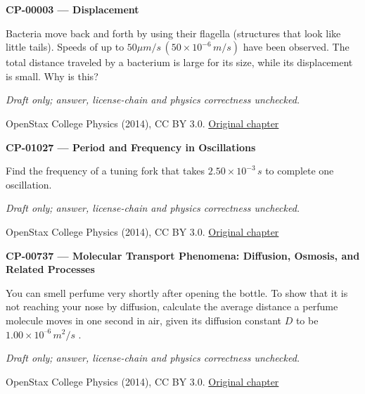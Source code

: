 \par\medskip
\noindent\textbf{CP-00003 — Displacement}
\par Bacteria move back and forth by using their flagella (structures that look like little tails). Speeds of up to $50 \mu{}m/s\,(50\times{}{10}^{-6}\,m/s)$ have been observed. The total distance traveled by a bacterium is large for its size, while its displacement is small. Why is this?
\par\smallskip
\textit{Draft only; answer, license-chain and physics correctness unchecked.}
\par{\footnotesize OpenStax College Physics (2014), CC BY 3.0. \href{https://github.com/philschatz/physics-book/blob/a7efaa7e221fab1694022d8bb98b83a73ee31d3d/contents/m42033.md}{Original chapter}}\par\normalsize

\par\medskip
\noindent\textbf{CP-01027 — Period and Frequency in Oscillations}
\par Find the frequency of a tuning fork that takes $2.50\times{}{10}^{-3}\,s$ to complete one oscillation.
\par\smallskip
\textit{Draft only; answer, license-chain and physics correctness unchecked.}
\par{\footnotesize OpenStax College Physics (2014), CC BY 3.0. \href{https://github.com/philschatz/physics-book/blob/a7efaa7e221fab1694022d8bb98b83a73ee31d3d/contents/m42241.md}{Original chapter}}\par\normalsize

\par\medskip
\noindent\textbf{CP-00737 — Molecular Transport Phenomena: Diffusion, Osmosis, and Related Processes}
\par You can smell perfume very shortly after opening the bottle. To show that it is not reaching your nose by diffusion, calculate the average distance a perfume molecule moves in one second in air, given its diffusion constant $D$ to be $1.00\times{}{10}^{–6}\,{m}^{2}/s$ .
\par\smallskip
\textit{Draft only; answer, license-chain and physics correctness unchecked.}
\par{\footnotesize OpenStax College Physics (2014), CC BY 3.0. \href{https://github.com/philschatz/physics-book/blob/a7efaa7e221fab1694022d8bb98b83a73ee31d3d/contents/m42212.md}{Original chapter}}\par\normalsize

